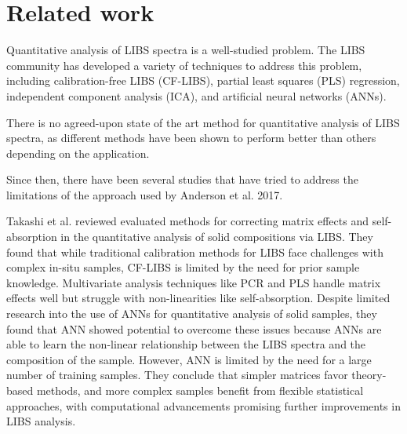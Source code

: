 \section{Related work}\label{sec:related_works}


Quantitative analysis of LIBS spectra is a well-studied problem.
The LIBS community has developed a variety of techniques to address this problem, including calibration-free LIBS (CF-LIBS), partial least squares (PLS) regression, independent component analysis (ICA), and artificial neural networks (ANNs).

There is no agreed-upon state of the art method for quantitative analysis of LIBS spectra, as different methods have been shown to perform better than others depending on the application.


Since then, there have been several studies that have tried to address the limitations of the approach used by Anderson et al. 2017.

Takashi et al. reviewed evaluated methods for correcting matrix effects and self-absorption in the quantitative analysis of solid compositions via LIBS.
They found that while traditional calibration methods for LIBS face challenges with complex in-situ samples, CF-LIBS is limited by the need for prior sample knowledge.
Multivariate analysis techniques like PCR and PLS handle matrix effects well but struggle with non-linearities like self-absorption.
Despite limited research into the use of ANNs for quantitative analysis of solid samples, they found that ANN showed potential to overcome these issues because ANNs are able to learn the non-linear relationship between the LIBS spectra and the composition of the sample.
However, ANN is limited by the need for a large number of training samples.
They conclude that simpler matrices favor theory-based methods, and more complex samples benefit from flexible statistical approaches, with computational advancements promising further improvements in LIBS analysis.




